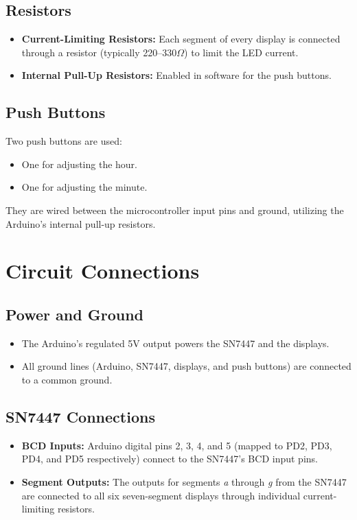 \documentclass[12pt]{article}
\begin{document}
\subsection{Resistors}
\begin{itemize}
    \item \textbf{Current-Limiting Resistors:} Each segment of every display is connected through a resistor (typically 220–330\(\Omega\)) to limit the LED current.
    \item \textbf{Internal Pull-Up Resistors:} Enabled in software for the push buttons.
\end{itemize}

\subsection{Push Buttons}
Two push buttons are used:
\begin{itemize}
    \item One for adjusting the hour.
    \item One for adjusting the minute.
\end{itemize}
They are wired between the microcontroller input pins and ground, utilizing the Arduino’s internal pull-up resistors.

\section{Circuit Connections}
\subsection{Power and Ground}
\begin{itemize}
    \item The Arduino’s regulated 5V output powers the SN7447 and the displays.
    \item All ground lines (Arduino, SN7447, displays, and push buttons) are connected to a common ground.
\end{itemize}

\subsection{SN7447 Connections}
\begin{itemize}
    \item \textbf{BCD Inputs:}  
    Arduino digital pins 2, 3, 4, and 5 (mapped to PD2, PD3, PD4, and PD5 respectively) connect to the SN7447's BCD input pins.
    \item \textbf{Segment Outputs:}  
    The outputs for segments \textit{a} through \textit{g} from the SN7447 are connected to all six seven-segment displays through individual current-limiting resistors.
\end{itemize}
\end{document}
